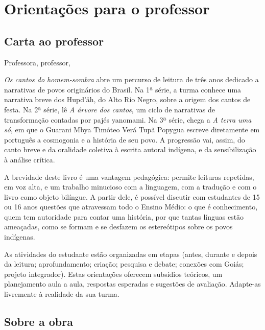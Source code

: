 
\blankAtodd
\part{Orientações para o professor}

\chapter{Carta ao professor}

Professora, professor,

\textit{Os cantos do homem-sombra} abre um percurso de leitura de três
anos dedicado a narrativas de povos originários do Brasil. Na 1ª série,
a turma conhece uma narrativa breve dos Hupd'äh, do Alto Rio Negro,
sobre a origem dos cantos de festa. Na 2ª série, lê \textit{A árvore dos
cantos}, um ciclo de narrativas de transformação contadas por pajés
yanomami. Na 3ª série, chega a \textit{A terra uma só}, em que o Guarani
Mbya Timóteo Verá Tupã Popygua escreve diretamente em português a
cosmogonia e a história de seu povo. A progressão vai, assim, do canto
breve e da oralidade coletiva à escrita autoral indígena, e da
sensibilização à análise crítica.

A brevidade deste livro é uma vantagem pedagógica: permite leituras
repetidas, em voz alta, e um trabalho minucioso com a linguagem, com a
tradução e com o livro como objeto bilíngue. A partir dele, é possível
discutir com estudantes de 15 ou 16 anos questões que atravessam todo o
Ensino Médio: o que é conhecimento, quem tem autoridade para contar uma
história, por que tantas línguas estão ameaçadas, como se formam e se
desfazem os estereótipos sobre os povos indígenas.

As atividades do estudante estão organizadas em etapas (antes, durante e
depois da leitura; aprofundamento; criação; pesquisa e debate; conexões
com Goiás; projeto integrador). Estas orientações oferecem subsídios
teóricos, um planejamento aula a aula, respostas esperadas e sugestões
de avaliação. Adapte-as livremente à realidade da sua turma.

\chapter{Sobre a obra}


